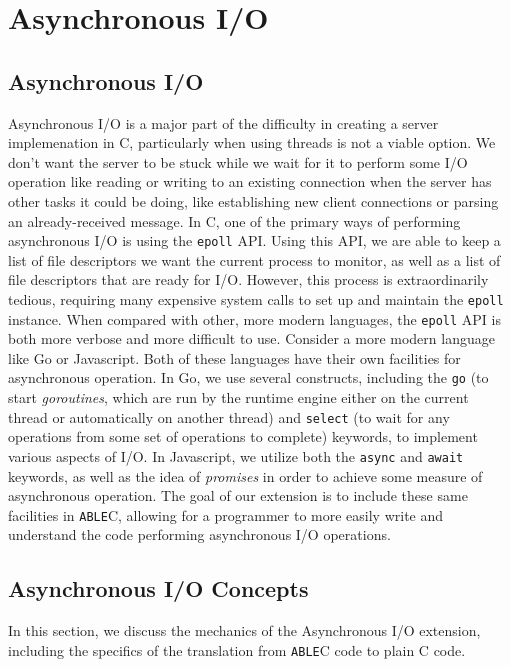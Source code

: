 \documentclass[main.tex]{subfiles}
\begin{document}
\section{Asynchronous I/O}

\subsection{Asynchronous I/O}
Asynchronous I/O is a major part of the difficulty in creating a server
implemenation in C, particularly when using threads is not a viable option. We
don't want the server to be stuck while we wait for it to perform some I/O
operation like reading or writing to an existing connection when the server has
other tasks it could be doing, like establishing new client connections or
parsing an already-received message. In C, one of the primary ways of performing
asynchronous I/O is using the \verb|epoll| API. Using this API, we are able to
keep a list of file descriptors we want the current process to monitor, as well
as a list of file descriptors that are ready for I/O. However, this process is
extraordinarily tedious, requiring many expensive system calls to set up and
maintain the \verb|epoll| instance. When compared with other, more modern
languages, the \verb|epoll| API is both more verbose and more difficult to use.
Consider a more modern language like Go or Javascript. Both of these languages
have their own facilities for asynchronous operation. In Go, we use several
constructs, including the \verb|go| (to start \emph{goroutines}, which are run by the runtime engine
either on the current thread or automatically on another thread) and \verb|select| (to wait for any operations
from some set of operations to complete) keywords, to implement
various aspects of I/O. In Javascript, we utilize both the \verb|async| and
\verb|await| keywords, as well as the idea of \emph{promises} in order to
achieve some measure of asynchronous operation. The goal of our extension is to
include these same facilities in \verb|ABLE|C, allowing for a programmer to more
easily write and understand the code performing asynchronous I/O operations.

\subsection{Asynchronous I/O Concepts}
In this section, we discuss the mechanics of the Asynchronous I/O extension, including
the specifics of the translation from \verb|ABLE|C code to plain C code.
\end{document}
